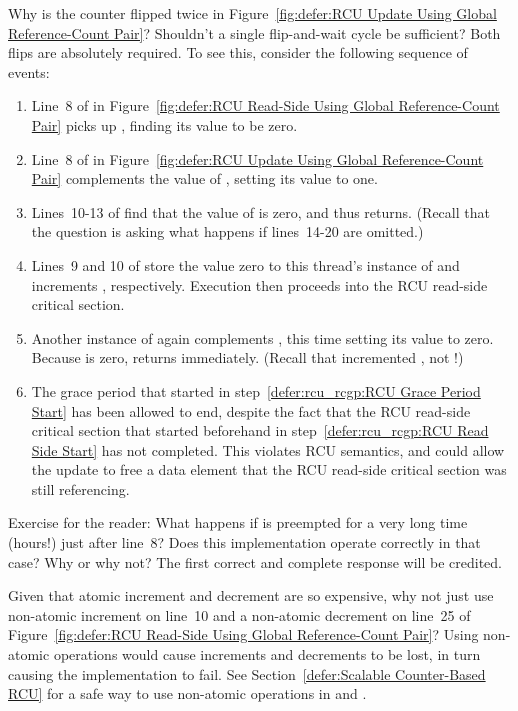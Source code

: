 \begin{enumerate}
\QuickQ{}
	Why is the counter flipped twice in
	Figure~\ref{fig:defer:RCU Update Using Global Reference-Count Pair}?
	Shouldn't a single flip-and-wait cycle be sufficient?
\QuickA{}
	Both flips are absolutely required.
	To see this, consider the following sequence of events:
	\begin{enumerate}
	\item	Line~8 of  in
		Figure~\ref{fig:defer:RCU Read-Side Using Global Reference-Count Pair}
		picks up , finding its value to be zero.
	\item	Line~8 of  in
		Figure~\ref{fig:defer:RCU Update Using Global Reference-Count Pair}
		complements the value of , setting its
		value to one.
	\item	Lines~10-13 of  find that the
		value of  is zero, and thus
		returns.
		(Recall that the question is asking what happens if
		lines~14-20 are omitted.)
	\item	Lines~9 and 10 of  store the
		value zero to this thread's instance of 
		and increments , respectively.
		Execution then proceeds into the RCU read-side critical
		section.
		\label{defer:rcu_rcgp:RCU Read Side Start}
	\item	Another instance of  again complements
		, this time setting its value to zero.
		Because  is zero, 
		returns immediately.
		(Recall that  incremented
		, not !)
		\label{defer:rcu_rcgp:RCU Grace Period Start}
	\item	The grace period that started in
		step~\ref{defer:rcu_rcgp:RCU Grace Period Start}
		has been allowed to end, despite
		the fact that the RCU read-side critical section
		that started beforehand in
		step~\ref{defer:rcu_rcgp:RCU Read Side Start}
		has not completed.
		This violates RCU semantics, and could allow the update
		to free a data element that the RCU read-side critical
		section was still referencing.
	\end{enumerate}

	Exercise for the reader: What happens if 
	is preempted for a very long time (hours!) just after
	line~8?
	Does this implementation operate correctly in that case?
	Why or why not?
	The first correct and complete response will be credited.

\QuickQ{}
	Given that atomic increment and decrement are so expensive,
	why not just use non-atomic increment on line~10 and a
	non-atomic decrement on line~25 of
	Figure~\ref{fig:defer:RCU Read-Side Using Global Reference-Count Pair}?
\QuickA{}
	Using non-atomic operations would cause increments and decrements
	to be lost, in turn causing the implementation to fail.
	See Section~\ref{defer:Scalable Counter-Based RCU}
	for a safe way to use non-atomic operations in
	 and .


\end{enumerate}

